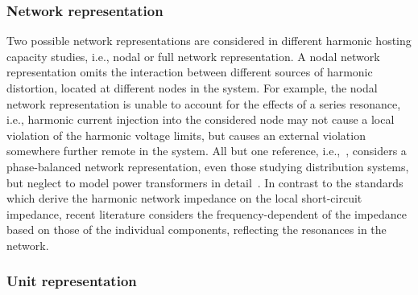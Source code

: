 \subsubsection{Network representation} 
\label{sec:network_representation} 

Two possible network representations are considered in different harmonic hosting capacity studies, i.e., nodal or full network representation. A nodal network representation omits the interaction between different sources of harmonic distortion, located at different nodes in the system. For example, the nodal network representation is unable to account for the effects of a series resonance, i.e., harmonic current injection into the considered node may not cause a local violation of the harmonic voltage limits, but causes an external violation somewhere further remote in the system. All but one reference, i.e.,~\cite{carmelito_hosting_2023}, considers a phase-balanced network representation, even those studying distribution systems, but neglect to model power transformers in detail~\cite{geth_harmonic_2022}. In contrast to the standards which derive the harmonic network impedance on the local short-circuit impedance, recent literature considers the frequency-dependent of the impedance based on those of the individual components, reflecting the resonances in the network.



\subsubsection{Unit representation} 
\label{sec:unit_representation}

